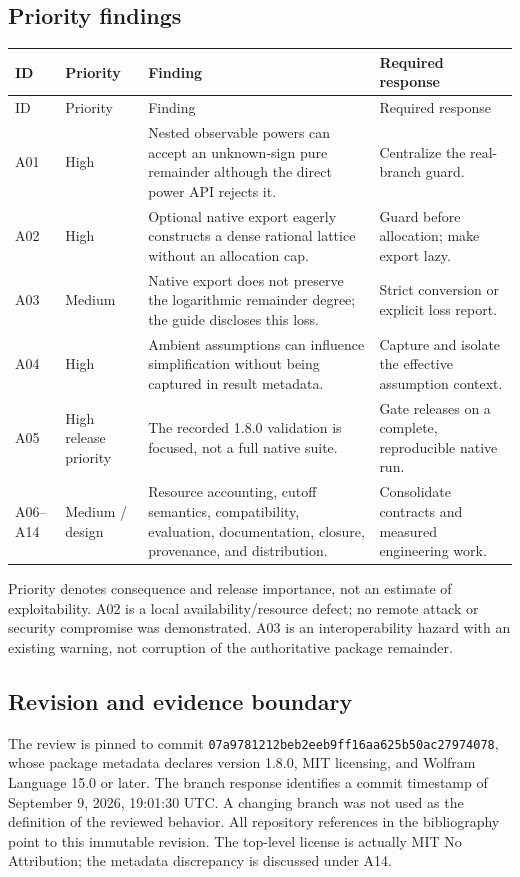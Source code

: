 \documentclass[11pt,a4paper]{article}
\newcommand{\code}[1]{\texttt{\detokenize{#1}}}
\newcommand{\commit}{\texttt{07a9781212beb2eeb9ff16aa625b50ac27974078}}
\theoremstyle{remark}\newtheorem{remark}[proposition]{Remark}
\begin{document}
\subsection{Priority findings}
\begin{longtable}{P{0.09\textwidth}P{0.14\textwidth}P{0.42\textwidth}P{0.24\textwidth}}
\toprule ID & Priority & Finding & Required response \\\midrule
\endfirsthead
\toprule ID & Priority & Finding & Required response \\\midrule
\endhead
A01 & High & Nested observable powers can accept an unknown-sign pure remainder although the direct power API rejects it. & Centralize the real-branch guard. \\
A02 & High & Optional native export eagerly constructs a dense rational lattice without an allocation cap. & Guard before allocation; make export lazy. \\
A03 & Medium & Native export does not preserve the logarithmic remainder degree; the guide discloses this loss. & Strict conversion or explicit loss report. \\
A04 & High & Ambient assumptions can influence simplification without being captured in result metadata. & Capture and isolate the effective assumption context. \\
A05 & High release priority & The recorded 1.8.0 validation is focused, not a full native suite. & Gate releases on a complete, reproducible native run. \\
A06--A14 & Medium / design & Resource accounting, cutoff semantics, compatibility, evaluation, documentation, closure, provenance, and distribution. & Consolidate contracts and measured engineering work. \\
\bottomrule
\end{longtable}
Priority denotes consequence and release importance, not an estimate of exploitability. A02 is a local availability/resource defect; no remote attack or security compromise was demonstrated. A03 is an interoperability hazard with an existing warning, not corruption of the authoritative package remainder.

\subsection{Revision and evidence boundary}
The review is pinned to commit \commit, whose package metadata declares version 1.8.0, MIT licensing, and Wolfram Language 15.0 or later. The branch response identifies a commit timestamp of September 9, 2026, 19:01:30 UTC. A changing \code{main} branch was not used as the definition of the reviewed behavior. All repository references in the bibliography point to this immutable revision. The top-level license is actually MIT No Attribution; the metadata discrepancy is discussed under A14.\cite{revision,paclet,license}
\end{document}
